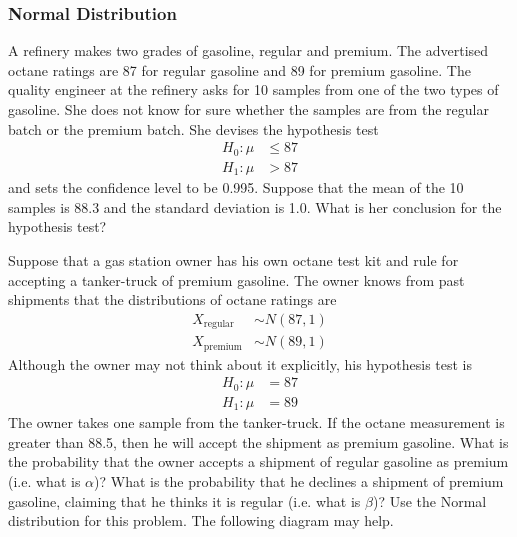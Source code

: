 \subsubsection*{Normal Distribution}
A refinery makes two grades of gasoline, regular and premium.  The
advertised octane ratings are 87 for regular gasoline and 89 for
premium gasoline.  The quality engineer at the refinery asks for 10
samples from one of the two types of gasoline. She does not know for
sure whether the samples are from the regular batch or the premium
batch. She devises the hypothesis test
\begin{align*}
H_0: \mu &\leq 87 \\
H_1: \mu &> 87
\end{align*}
and sets the confidence level to be 0.995. Suppose that the mean of
the 10 samples is 88.3 and the standard deviation is 1.0. What is her
conclusion for the hypothesis test?

Suppose that a gas station owner has his own octane test
kit and rule for accepting a tanker-truck of premium gasoline.
The owner knows from past shipments that the distributions
of octane ratings are
\begin{align*}
X_{\text{regular}} &\sim N(87,1) \\
X_{\text{premium}} &\sim N(89,1)
\end{align*}
Although the owner may not think about it explicitly, his hypothesis
test is
\begin{align*}
H_0: \mu &= 87 \\
H_1: \mu &= 89
\end{align*}
The owner takes one sample from the tanker-truck. If the octane
measurement is greater than 88.5, then he will accept the shipment as
premium gasoline. What is the probability that the owner accepts a
shipment of regular gasoline as premium (i.e. what is $\alpha$)? What
is the probability that he declines a shipment of premium gasoline,
claiming that he thinks it is regular (i.e. what is $\beta$)?  Use the
Normal distribution for this problem. The following diagram may help.

